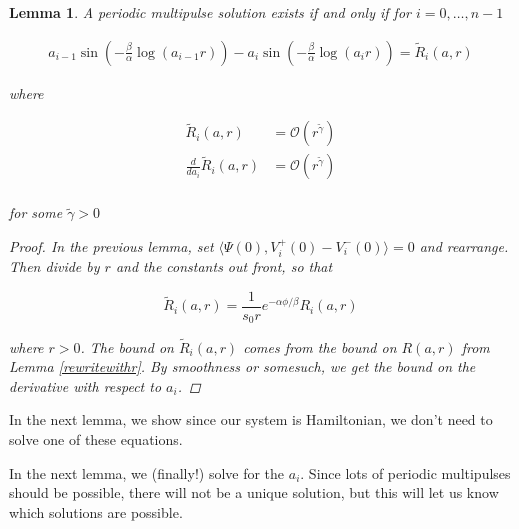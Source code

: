 \documentclass[12pt]{article}
\newtheorem{lemma}{Lemma}
\begin{document}

\begin{lemma}\label{systemtosolve}
A periodic multipulse solution exists if and only if for $i = 0, \dots, n-1$

\begin{align*}
a_{i-1} \sin \left( - \frac{\beta}{\alpha} \log (a_{i-1} r) \right) - a_i \sin \left( - \frac{\beta}{\alpha} \log (a_i r) \right) = \tilde{R}_i(a, r)
\end{align*}

where 

\begin{align*}
\tilde{R}_i(a, r) &= \mathcal{O}(r^{\tilde{\gamma}}) \\
\frac{d}{d a_i} \tilde{R}_i(a, r) &= \mathcal{O}(r^{\tilde{\gamma}}) \\
\end{align*}

for some $\tilde{\gamma} > 0$

\begin{proof}
In the previous lemma, set $\langle \Psi(0), V_i^+(0) - V_i^-(0) \rangle = 0$ and rearrange. Then divide by $r$ and the constants out front, so that

\[
\tilde{R}_i(a, r) = \frac{1}{s_0 r} e^{-\alpha \phi / \beta } R_i(a, r)
\]

where $r > 0$. The bound on $\tilde{R}_i(a, r)$ comes from the bound on $R(a, r)$ from Lemma \ref{rewritewithr}. By smoothness or somesuch, we get the bound on the derivative with respect to $a_i$.
\end{proof}
\end{lemma}

In the next lemma, we show since our system is Hamiltonian, we don't need to solve one of these equations.


In the next lemma, we (finally!) solve for the $a_i$. Since lots of periodic multipulses should be possible, there will not be a unique solution, but this will let us know which solutions are possible.

\end{document}
